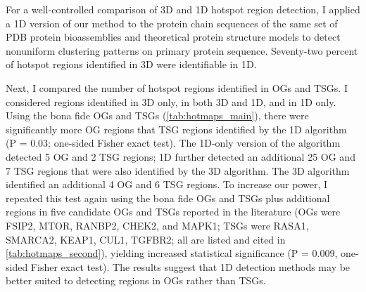For a well-controlled comparison of 3D and 1D hotspot region detection, I applied a 1D version of our method to the protein chain sequences of the same set of PDB protein bioassemblies and theoretical protein structure models to detect nonuniform clustering patterns on primary protein sequence. Seventy-two percent of hotspot regions identified in 3D were identifiable in 1D.

Next, I compared the number of hotspot regions identified in OGs and TSGs. I considered regions identified in 3D only, in both 3D and 1D, and in 1D only. Using the bona fide OGs and TSGs (\autoref{tab:hotmaps_main}), there were significantly more OG regions that TSG regions identified by the 1D algorithm (P = 0.03; one-sided Fisher exact test). The 1D-only version of the algorithm detected 5 OG and 2 TSG regions; 1D further detected an additional 25 OG and 7 TSG regions that were also identified by the 3D algorithm. The 3D algorithm identified an additional 4 OG and 6 TSG regions. To increase our power, I repeated this test again using the bona fide OGs and TSGs plus additional regions in five candidate OGs and TSGs reported in the literature (OGs were FSIP2, MTOR, RANBP2, CHEK2, and MAPK1; TSGs were RASA1, SMARCA2, KEAP1, CUL1, TGFBR2; all are listed and cited in \autoref{tab:hotmaps_second}), yielding increased statistical significance (P = 0.009, one-sided Fisher exact test). The results suggest that 1D detection methods may be better suited to detecting regions in OGs rather than TSGs.

